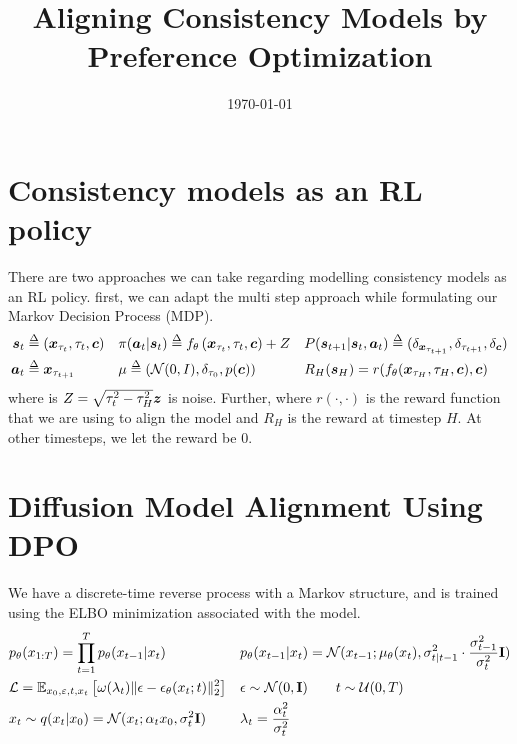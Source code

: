\documentclass[10pt]{article}
\title{\fontsize{15}{17}\selectfont Aligning Consistency Models by\\ Preference Optimization}
\date{\today}
\begin{document}
\maketitlestart

\section{Consistency models as an RL policy}

There are two approaches we can take regarding modelling consistency models as an RL policy. first, we can adapt the multi step approach while
formulating our Markov Decision Process (MDP).
\begin{align*}
	\bs_t & \defeq (\bx_{\tau_t}, \tau_t, \bc) &  & \pi(\ba_t | \bs_t) \defeq f_{\theta}\left(\bx_{\tau_t}, \tau_t, \bc \right) + Z &  & P(\bs_{t+1} | \bs_t, \ba_t) \defeq (\delta_{\bx_{\tau_{t+1}}}, \delta_{\tau_{t+1}}, \delta_{\bc}) \\
	\ba_t & \defeq \bx_{\tau_{t+1}}            &  & \mu \defeq \left(\Ncal(0, I), \delta_{\tau_0}, p(\bc)\right)                    &  & R_H(\bs_H) = r(f_\theta(\bx_{\tau_H}, \tau_H, \bc), \bc)
\end{align*}
where is $Z = \sqrt{\tau_t^2 - \tau_H^2}\bm{z}$ is noise. Further, where $r(\cdot, \cdot)$ is the reward function that we are using to align the model and $R_H$ is the reward at timestep $H$. At other timesteps, we let the reward be $0$.

\section{Diffusion Model Alignment Using DPO}

We have a discrete-time reverse process with a Markov structure, and is trained using the ELBO minimization associated with the model.
\begin{align}
	 & p_\theta(x_{1:T})  =\prod_{t=1}^{T}p_\theta(x_{t-1}|x_t)                                                       &  & p_\theta(x_{t-1}|x_t)=\mathcal{N}(x_{t-1};\mu_\theta(x_{t}), \sigma^2_{t|t-1}\cdot\frac{\sigma_{t-1}^2}{\sigma_t^2}\mathbf{I}) \\
	 & \mathcal{L}  =\mathbb{E}_{x_0,\varepsilon,t,x_t}\left[\omega(\lambda_t)\|\epsilon-\epsilon_\theta(x_t;t)\|_2^2\right] &  & \epsilon\sim\mathcal{N}(0,\mathbf{I})\qquad t\sim\mathcal{U}(0, T)                                                             \\
	 & x_t \sim q(x_t|x_0)=\mathcal{N}(x_t;\alpha_tx_0,\sigma_t^2\mathbf{I})                                          &  & \lambda_t=\frac{\alpha_t^2}{\sigma_t^2}
\end{align}
\end{document}
